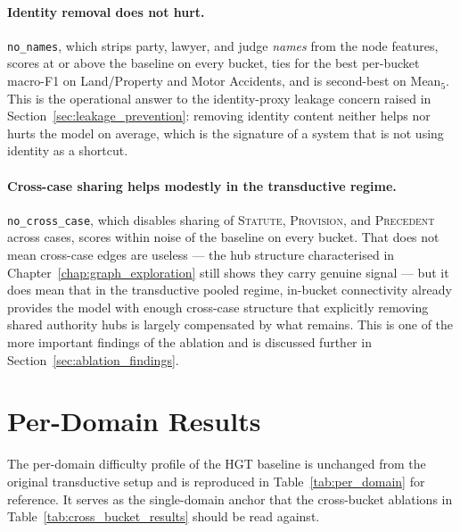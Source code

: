 \paragraph{Identity removal does not hurt.} \texttt{no\_names},
which strips party, lawyer, and judge \emph{names} from the node
features, scores at or above the baseline on every bucket, ties for
the best per-bucket macro-F1 on Land/Property and Motor Accidents,
and is second-best on Mean$_5$. This is the operational answer to
the identity-proxy leakage concern raised in
Section~\ref{sec:leakage_prevention}: removing identity content
neither helps nor hurts the model on average, which is the signature
of a system that is not using identity as a shortcut.

\paragraph{Cross-case sharing helps modestly in the transductive
regime.} \texttt{no\_cross\_case}, which disables sharing of
\textsc{Statute}, \textsc{Provision}, and \textsc{Precedent} across
cases, scores within noise of the baseline on every bucket. That
does not mean cross-case edges are useless --- the hub structure
characterised in Chapter~\ref{chap:graph_exploration} still shows
they carry genuine signal --- but it does mean that in the
transductive pooled regime, in-bucket connectivity already provides
the model with enough cross-case structure that explicitly removing
shared authority hubs is largely compensated by what remains. This
is one of the more important findings of the ablation and is
discussed further in Section~\ref{sec:ablation_findings}.

\section{Per-Domain Results}

The per-domain difficulty profile of the HGT baseline is unchanged
from the original transductive setup and is reproduced in
Table~\ref{tab:per_domain} for reference. It serves as the
single-domain anchor that the cross-bucket ablations in
Table~\ref{tab:cross_bucket_results} should be read against.

